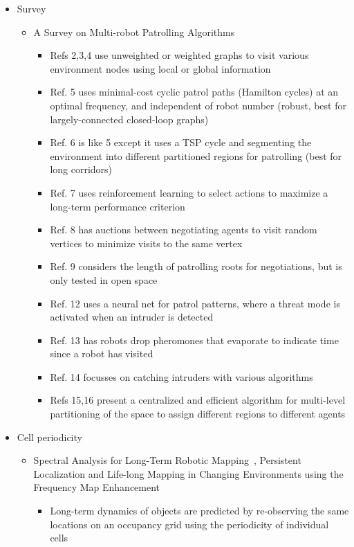 \documentclass[review]{elsarticle}
\begin{document}
\begin{itemize}
	\item Survey
	\begin{itemize}
		\item A Survey on Multi-robot Patrolling Algorithms~\cite{PorRoc11}
		\begin{itemize}
			\item Refs 2,3,4 use unweighted or weighted graphs to visit various environment nodes using local or global information
			\item Ref. 5 uses minimal-cost cyclic patrol paths (Hamilton cycles) at an optimal frequency, and independent of robot number (robust, best for largely-connected closed-loop graphs)
			\item Ref. 6 is like 5 except it uses a TSP cycle and segmenting the environment into different partitioned regions for patrolling (best for long corridors)
			\item Ref. 7 uses reinforcement learning to select actions to maximize a long-term performance criterion
			\item Ref. 8 has auctions between negotiating agents to visit random vertices to minimize visits to the same vertex
			\item Ref. 9 considers the length of patrolling roots for negotiations, but is only tested in open space
			\item Ref. 12 uses a neural net for patrol patterns, where a threat mode is activated when an intruder is detected
			\item Ref. 13 has robots drop pheromones that evaporate to indicate time since a robot has visited
			\item Ref. 14 focusses on catching intruders with various algorithms
			\item Refs 15,16 present a centralized and efficient algorithm for multi-level partitioning of the space to assign different regions to different agents
		\end{itemize}
	\end{itemize}
	\item Cell periodicity
	\begin{itemize}
		\item Spectral Analysis for Long-Term Robotic Mapping~\cite{KraFenCieDonDuc14}, Persistent Localization and Life-long Mapping in Changing Environments using the Frequency Map Enhancement~\cite{KraFenHanDuc16}
		\begin{itemize}
			\item Long-term dynamics of objects are predicted by re-observing the same locations on an occupancy grid using the periodicity of individual cells

\end{itemize}
\end{itemize}
\end{itemize}
\end{document}
